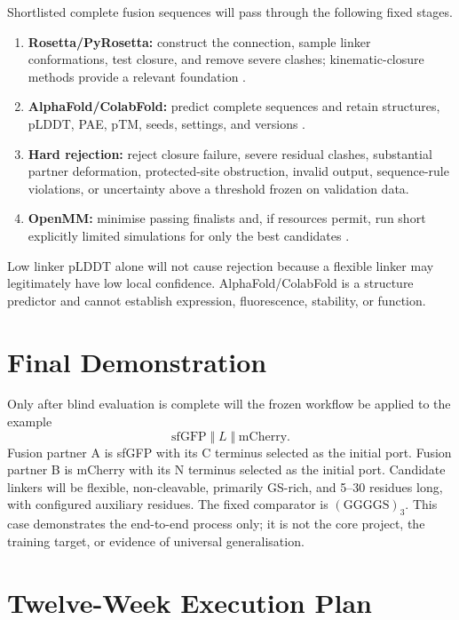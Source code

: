 \documentclass[10pt,a4paper]{article}
\begin{document}
Shortlisted complete fusion sequences will pass through the following fixed stages.

\begin{enumerate}
  \item \textbf{Rosetta/PyRosetta:} construct the connection, sample linker conformations, test closure, and remove severe clashes; kinematic-closure methods provide a relevant foundation \citep{stein2013}.
  \item \textbf{AlphaFold/ColabFold:} predict complete sequences and retain structures, pLDDT, PAE, pTM, seeds, settings, and versions \citep{jumper2021,mirdita2022}.
  \item \textbf{Hard rejection:} reject closure failure, severe residual clashes, substantial partner deformation, protected-site obstruction, invalid output, sequence-rule violations, or uncertainty above a threshold frozen on validation data.
  \item \textbf{OpenMM:} minimise passing finalists and, if resources permit, run short explicitly limited simulations for only the best candidates \citep{eastman2024}.
\end{enumerate}

Low linker pLDDT alone will not cause rejection because a flexible linker may legitimately have low local confidence. AlphaFold/ColabFold is a structure predictor and cannot establish expression, fluorescence, stability, or function.

\section{Final Demonstration}

Only after blind evaluation is complete will the frozen workflow be applied to the example
\begin{equation}
  \mathrm{sfGFP}\;\Vert\;L\;\Vert\;\mathrm{mCherry}.
\end{equation}
Fusion partner A is sfGFP with its C terminus selected as the initial port. Fusion partner B is mCherry with its N terminus selected as the initial port. Candidate linkers will be flexible, non-cleavable, primarily GS-rich, and 5--30 residues long, with configured auxiliary residues. The fixed comparator is $(\mathrm{GGGGS})_3$. This case demonstrates the end-to-end process only; it is not the core project, the training target, or evidence of universal generalisation.

\section{Twelve-Week Execution Plan}
\end{document}
